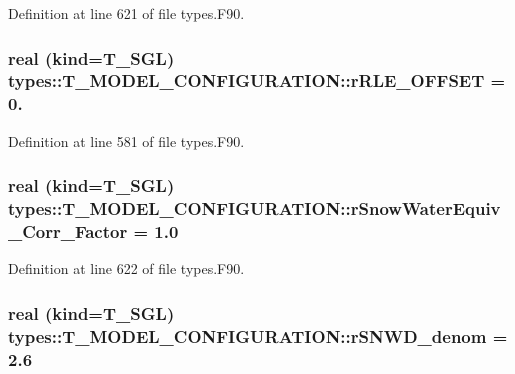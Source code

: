 Definition at line 621 of file types.F90.

\hypertarget{typetypes_1_1_t___m_o_d_e_l___c_o_n_f_i_g_u_r_a_t_i_o_n_ab6e623ffe3835e9729a518f410ce74b0}{
\subsubsection[{rRLE\_\-OFFSET}]{\setlength{\rightskip}{0pt plus 5cm}real (kind={\bf T\_\-SGL}) {\bf types::T\_\-MODEL\_\-CONFIGURATION::rRLE\_\-OFFSET} = 0.}}
\label{typetypes_1_1_t___m_o_d_e_l___c_o_n_f_i_g_u_r_a_t_i_o_n_ab6e623ffe3835e9729a518f410ce74b0}


Definition at line 581 of file types.F90.

\hypertarget{typetypes_1_1_t___m_o_d_e_l___c_o_n_f_i_g_u_r_a_t_i_o_n_a633b7317b357bdd5ec1837e6bf8c71dc}{
\subsubsection[{rSnowWaterEquiv\_\-Corr\_\-Factor}]{\setlength{\rightskip}{0pt plus 5cm}real (kind={\bf T\_\-SGL}) {\bf types::T\_\-MODEL\_\-CONFIGURATION::rSnowWaterEquiv\_\-Corr\_\-Factor} = 1.0}}
\label{typetypes_1_1_t___m_o_d_e_l___c_o_n_f_i_g_u_r_a_t_i_o_n_a633b7317b357bdd5ec1837e6bf8c71dc}


Definition at line 622 of file types.F90.

\hypertarget{typetypes_1_1_t___m_o_d_e_l___c_o_n_f_i_g_u_r_a_t_i_o_n_a3df792affe14af9821dddc977322a6d9}{
\subsubsection[{rSNWD\_\-denom}]{\setlength{\rightskip}{0pt plus 5cm}real (kind={\bf T\_\-SGL}) {\bf types::T\_\-MODEL\_\-CONFIGURATION::rSNWD\_\-denom} = 2.6}}
\label{typetypes_1_1_t___m_o_d_e_l___c_o_n_f_i_g_u_r_a_t_i_o_n_a3df792affe14af9821dddc977322a6d9}


